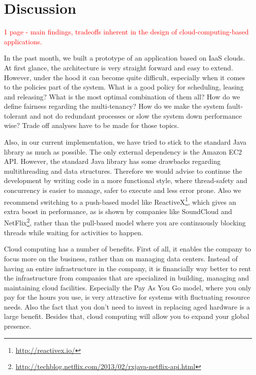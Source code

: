 \documentclass{stylesheet}
\begin{document}
\section{Discussion}
\label{sec:discussion}
\textcolor{red}{1 page - main findings, tradeoffs inherent in the design of cloud-computing-based applications.}

In the past month, we built a prototype of an application based on IaaS clouds. At first glance, the architecture is very straight forward and easy to extend. However, under the hood it can become quite difficult, especially when it comes to the policies part of the system. What is a good policy for scheduling, leasing and releasing? What is the most optimal combination of them all? How do we define fairness regarding the multi-tenancy? How do we make the system fault-tolerant and not do redundant processes or slow the system down performance wise? Trade off analyses have to be made for those topics.

Also, in our current implementation, we have tried to stick to the standard Java library as much as possible. The only external dependency is the Amazon EC2 API. However, the standard Java library has some drawbacks regarding multithreading and data structures. Therefore we would advise to continue the development by writing code in a more functional style, where thread-safety and concurrency is easier to manage, safer to execute and less error prone. Also we recommend switching to a push-based model like ReactiveX\footnote{\url{http://reactivex.io/}}, which gives an extra boost in performance, as is shown by companies like SoundCloud and NetFlix\footnote{\url{http://techblog.netflix.com/2013/02/rxjava-netflix-api.html}}, rather than the pull-based model where you are continuously blocking threads while waiting for activities to happen.

Cloud computing has a number of benefits. First of all, it enables the company to focus more on the business, rather than on managing data centers. Instead of having an entire infrastructure in the company, it is financially way better to rent the infrastructure from companies that are specialized in building, managing and maintaining cloud facilities. Especially the Pay As You Go model, where you only pay for the hours you use, is very attractive for systems with fluctuating resource needs. Also the fact that you don't need to invest in replacing aged hardware is a large benefit. Besides that, cloud computing will allow you to expand your global presence.
\end{document}
